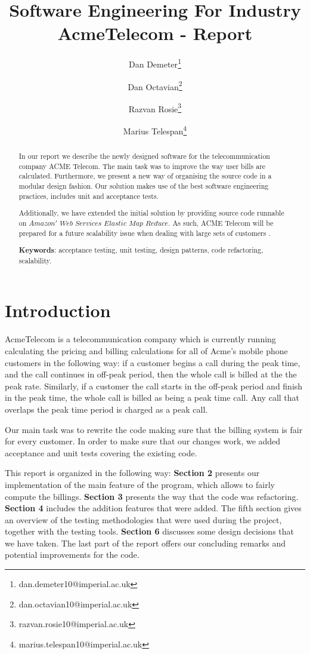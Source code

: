 \documentclass[11pt,twocolumn]{article} %
\title{Software Engineering For Industry \\ AcmeTelecom - Report}
\author[1]{Dan Demeter\thanks{dan.demeter10@imperial.ac.uk}}
\author[1]{Dan Octavian\thanks{dan.octavian10@imperial.ac.uk}}
\author[1]{Razvan Rosie\thanks{razvan.rosie10@imperial.ac.uk}}
\author[1]{Marius Telespan\thanks{marius.telespan10@imperial.ac.uk}}
\affil[1]{Department of Computing, Imperial College London}
\begin{document}
\maketitle

\begin{abstract}
In our report we describe the newly designed software for the telecommunication company ACME Telecom. The main task was to improve the way 
user bills are calculated. Furthermore, we present a new way of organising the source code in a modular design fashion. 
Our solution makes use of the best software engineering practices, includes unit and acceptance tests.

Additionally, we have extended the initial solution by providing source code runnable on $Amazon'$ $Web$ $Services$ $Elastic$ $Map$ $Reduce$. As such, 
ACME Telecom will be prepared for a future scalability issue when dealing with large sets of customers .
\newline

{\bf Keywords}: acceptance testing, unit testing, design patterns, code refactoring, scalability.
\end{abstract}


\section{Introduction}
AcmeTelecom is a telecommunication company which is currently running calculating the pricing and billing calculations
for all of Acme's mobile phone customers in the following way: if a customer begins a call during the peak time, and the call 
continues in off-peak period, then the whole call is billed at the the peak rate. Similarly, if a customer the call starts in 
the off-peak period and finish in the peak time, the whole call is billed as being a peak time call. Any call that overlaps the 
peak time period is charged as a peak call.

Our main task was to rewrite the code making sure that the billing system is fair for every customer. In order to make sure that our changes work,
we added acceptance and unit tests covering the existing code.

This report is organized in the following way: {\bf Section 2} presents our implementation of the main feature of the program, which
allows to fairly compute the billings. {\bf Section 3} presents the way that the code was refactoring. 
{\bf Section 4} includes the addition features that were added. 
The fifth section gives an overview of the testing methodologies that were used during the project, together with the testing tools.
{\bf Section 6} discusses some design decisions that we have taken.
The last part of the report offers our concluding remarks and potential improvements for the code.
\end{document}
